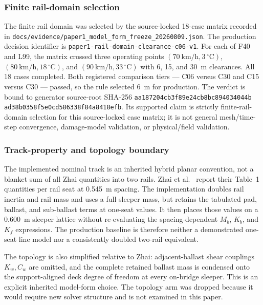 \subsubsection{Finite rail-domain selection}
\label{sec:rail_clearance}

The finite rail domain was selected by the source-locked 18-case matrix recorded
in \nolinkurl{docs/evidence/paper1_model_form_freeze_20260809.json}. The
production decision identifier is
\nolinkurl{paper1-rail-domain-clearance-c06-v1}.
For each of F40 and L99, the matrix crossed three operating points
$(70~\mathrm{km/h},3\,^{\circ}\mathrm{C})$,
$(80~\mathrm{km/h},18\,^{\circ}\mathrm{C})$, and
$(90~\mathrm{km/h},33\,^{\circ}\mathrm{C})$ with 6, 15, and 30~m clearances.
All 18 cases completed. Both registered comparison tiers --- C06 versus C30
and C15 versus C30 --- passed, so the rule selected 6~m for production. The
verdict is bound to generator source-root SHA-256
\texttt{aa187204cb3f89e2\allowbreak4cb8bc894034044b\allowbreak%
ad38b0358f5e0cd5\allowbreak86338f84a8418efb}.
Its supported claim is strictly finite-rail-domain selection for this
source-locked case matrix; it is not general mesh/time-step convergence,
damage-model validation, or physical/field validation.

\subsubsection{Track-property and topology boundary}
\label{sec:track_boundary}

The implemented nominal track is an inherited hybrid planar convention, not a
blanket sum of all Zhai quantities into two rails. Zhai et
al.~\cite{zhai2004track} report their Table~1 quantities per rail seat at
0.545~m spacing. The implementation doubles rail inertia and rail mass and uses
a full sleeper mass, but retains the tabulated pad, ballast, and sub-ballast
terms at one-seat values. It then places those values on a 0.600~m sleeper
lattice without re-evaluating the spacing-dependent $M_b$, $K_b$, and $K_f$
expressions. The production baseline is therefore neither a demonstrated
one-seat line model nor a consistently doubled two-rail equivalent.

The topology is also simplified relative to Zhai: adjacent-ballast shear
couplings $K_w,C_w$ are omitted, and the complete retained ballast mass is
condensed onto the support-aligned deck degree of freedom at every on-bridge
sleeper. This is an explicit inherited model-form choice. The topology arm was
dropped because it would require new solver structure and is not examined in
this paper.

